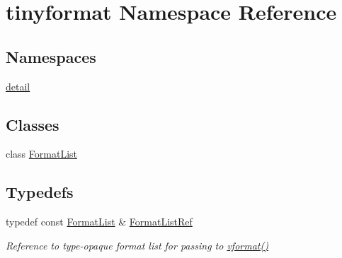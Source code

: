 \hypertarget{namespacetinyformat}{}\section{tinyformat Namespace Reference}
\label{namespacetinyformat}
\subsection*{Namespaces}
\begin{DoxyCompactItemize}
\item 
 \mbox{\hyperlink{namespacetinyformat_1_1detail}{detail}}
\end{DoxyCompactItemize}
\subsection*{Classes}
\begin{DoxyCompactItemize}
\item 
class \mbox{\hyperlink{classtinyformat_1_1_format_list}{Format\+List}}
\end{DoxyCompactItemize}
\subsection*{Typedefs}
\begin{DoxyCompactItemize}
\item 
typedef const \mbox{\hyperlink{classtinyformat_1_1_format_list}{Format\+List}} \& \mbox{\hyperlink{namespacetinyformat_ac2ce88095d287d22004006ed25117e0e}{Format\+List\+Ref}}
\begin{DoxyCompactList}\small\item\em Reference to type-\/opaque format list for passing to \mbox{\hyperlink{namespacetinyformat_a86ed74eb3ed66a662e96220d877da964}{vformat()}} \end{DoxyCompactList}\end{DoxyCompactItemize}
